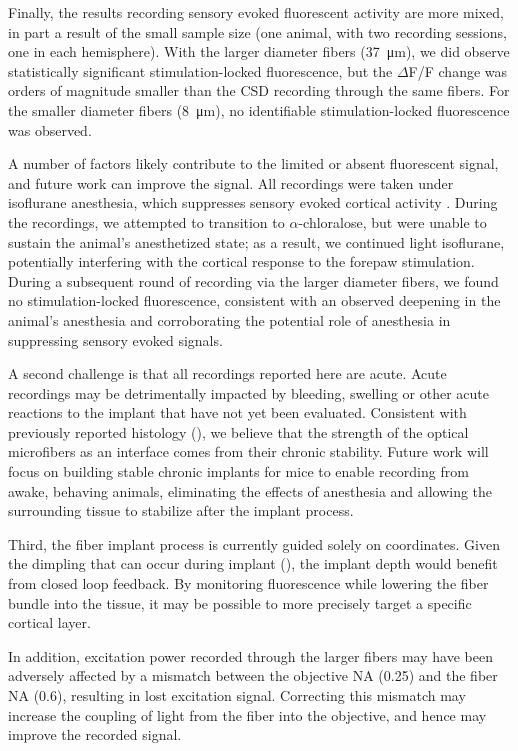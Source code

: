 Finally, the results recording sensory evoked fluorescent activity are
 more mixed, in part a result of the small sample size (one animal, 
with two recording sessions, one in each hemisphere). With the larger 
diameter fibers (37~\si{\micro\meter}), we did observe statistically 
significant stimulation-locked fluorescence, but the $\Delta$F/F 
change was orders of magnitude smaller than the CSD recording through 
the same fibers. For the smaller diameter fibers 
(8~\si{\micro\meter}), no identifiable stimulation-locked fluorescence
 was observed.

A number of factors likely contribute to the limited or absent 
fluorescent signal, and future work can improve the signal. All 
recordings were taken under isoflurane anesthesia, which suppresses 
sensory evoked cortical activity \cite{Sitdikova:2013fn}. During the 
recordings, we attempted to transition to $\alpha$-chloralose, but were 
unable to sustain the animal's anesthetized state; as a result, we 
continued light isoflurane, potentially interfering with the cortical 
response to the forepaw stimulation. During a subsequent round of 
recording via the larger diameter fibers, we found no stimulation-locked 
fluorescence, consistent with an observed deepening in the animal's 
anesthesia and corroborating the potential role of anesthesia in 
suppressing sensory evoked signals.

A second challenge is that all recordings reported here are acute. 
Acute recordings may be detrimentally impacted by bleeding, swelling 
or other acute reactions to the implant that have not yet been 
evaluated. Consistent with previously reported histology 
(), we believe that the strength of the optical 
microfibers as an interface comes from their chronic stability. Future
 work will focus on building stable chronic implants for mice to 
enable recording from awake, behaving animals, eliminating the effects
 of anesthesia and allowing the surrounding tissue to stabilize after 
the implant process.

Third, the fiber implant process is currently guided solely on 
coordinates. Given the dimpling that can occur during implant 
(), the implant depth would benefit from closed 
loop feedback. By monitoring fluorescence while lowering the fiber 
bundle into the tissue, it may be possible to more precisely target a 
specific cortical layer.

In addition, excitation power recorded through the larger fibers may 
have been adversely affected by a mismatch between the objective NA 
(0.25) and the fiber NA (0.6), resulting in lost excitation signal. 
Correcting this mismatch may increase the coupling of light from the 
fiber into the objective, and hence may improve the recorded signal.

